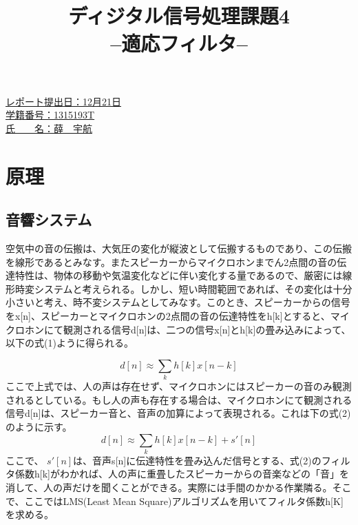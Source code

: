 \documentclass[a4j,12]{jarticle}
\def\idnumber{1315193T}
\def\name{薛　宇航}
\def\deadlinem{12}
\def\deadlined{21}
\begin{document}
\title{
  \vspace{1cm}{\LARGE 平成27年度}\\
  \begin{spacing}{1.5}
    {\Huge ディジタル信号処理課題4}\\
    {\huge --適応フィルタ--}
  \end{spacing}
  \author{}
  \date{}
}%
\maketitle
\vspace{5cm}
       {\Large
         \begin{spacing}{1.2}
           \hspace{20em}\underline{レポート提出日：\deadlinem 月\deadlined 日}\\
           \hspace{20em}\underline{学籍番号：\idnumber}\\
           \hspace{20em}\underline{氏　　名：\name}\\
         \end{spacing}
       }
       

       \thispagestyle{empty}
       \newpage
       \setcounter{page}{1}      %
       
       


       \section{原理}
       \subsection{音響システム}
       空気中の音の伝搬は、大気圧の変化が縦波として伝搬するものであり、この伝搬を線形であるとみなす。またスピーカーからマイクロホンまでん2点間の音の伝達特性は、物体の移動や気温変化などに伴い変化する量であるので、厳密には線形時変システムと考えられる。しかし、短い時間範囲であれば、その変化は十分小さいと考え、時不変システムとしてみなす。このとき、スピーカーからの信号をx[n]、スピーカーとマイクロホンの2点間の音の伝達特性をh[k]とすると、マイクロホンにて観測される信号d[n]は、二つの信号x[n]とh[k]の畳み込みによって、以下の式(1)ように得られる。

       \begin{equation}
         d[n] \approx \sum_k h[k]x[n-k]
       \end{equation}
       ここで上式では、人の声は存在せず、マイクロホンにはスピーカーの音のみ観測されるとしている。もし人の声も存在する場合は、マイクロホンにて観測される信号d[n]は、スピーカー音と、音声の加算によって表現される。これは下の式(2)のように示す。
       \begin{equation}
         d[n] \approx \sum_k h[k]x[n-k]+s'[n]         
       \end{equation}
       ここで、 $s'[n]$は、音声s[n]に伝達特性を畳み込んだ信号とする、式(2)のフィルタ係数h[k]がわかれば、人の声に重畳したスピーカーからの音楽などの「音」を消して、人の声だけを聞くことができる。実際には手間のかかる作業隣る。そこで、ここではLMS(Least Mean Square)アルゴリズムを用いてフィルタ係数h[K]を求める。
\end{document}
